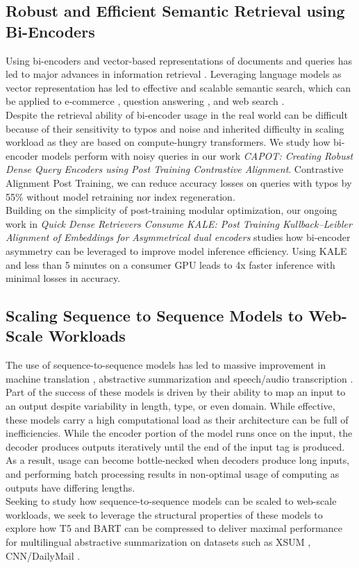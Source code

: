 \subsection{Robust and Efficient Semantic Retrieval using Bi-Encoders}
Using bi-encoders and vector-based representations of documents and queries has led to major advances in information retrieval \cite{Karpukhin2020DensePR}. Leveraging language models as vector representation has led to effective and scalable semantic search, which can be applied to e-commerce \cite{Magnani2022SemanticRA} \cite{Bi2020ATE}, question answering \cite{Qu2021RocketQAAO}, and web search \cite{Xiong2021ApproximateNN}. \\
Despite the retrieval ability of bi-encoder usage in the real world can be difficult because of their sensitivity to typos and noise \cite{Sidiropoulos2022AnalysingTR} and inherited difficulty in scaling workload as they are based on compute-hungry transformers.  We study how bi-encoder models perform with noisy queries in our work \textit{CAPOT: Creating Robust Dense Query Encoders using Post Training Contrastive Alignment}. Contrastive Alignment Post Training, we can reduce accuracy losses on queries with typos by 55\% without model retraining nor index regeneration.  \\
Building on the simplicity of post-training modular optimization, our ongoing work in
\textit{Quick Dense Retrievers Consume KALE: Post Training Kullback–Leibler Alignment of Embeddings for Asymmetrical dual encoders} studies how bi-encoder asymmetry can be leveraged to improve model inference efficiency. Using KALE and less than 5 minutes on a consumer GPU leads to 4x faster inference with minimal losses in accuracy. 
\subsection{Scaling Sequence to Sequence Models to Web-Scale Workloads}
The use of sequence-to-sequence models has led to massive improvement in machine translation \cite{Vaswani2017AttentionIA}, abstractive summarization \cite{Zhang2020PEGASUSPW} and speech/audio transcription \cite{Radford2022RobustSR}. Part of the success of these models is driven by their ability to map an input to an output despite variability in length, type, or even domain. While effective, these models carry a high computational load as their architecture can be full of inefficiencies. While the encoder portion of the model runs once on the input, the decoder produces outputs iteratively until the end of the input tag is produced. As a result, usage can become bottle-necked when decoders produce long inputs, and performing batch processing results in non-optimal usage of computing as outputs have differing lengths. \\
Seeking to study how sequence-to-sequence models can be scaled to web-scale workloads, we seek to leverage the structural properties of these models to explore how T5 \cite{Raffel2020ExploringTL} and BART \cite{Lewis2020BARTDS} can be compressed to deliver maximal performance for multilingual abstractive summarization on datasets such as XSUM \cite{Narayan2018DontGM}, CNN/DailyMail \cite{Nallapati2016AbstractiveTS}. \\
